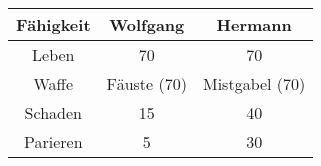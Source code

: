 \begin{tabular}{ccc}

  \toprule
  Fähigkeit & \textbf{Wolfgang} & \textbf{Hermann} \\
  \midrule
  Leben & 70 & 70 \\
  Waffe & Fäuste (70) & Mistgabel (70) \\
  Schaden & 15 & 40 \\
  Parieren & 5 & 30 \\
  \bottomrule
\end{tabular}
